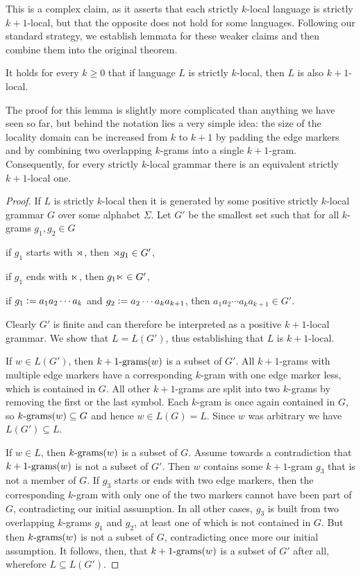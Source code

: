 This is a complex claim, as it asserts that each strictly $k$-local language is strictly $k+1$-local, but that the opposite does not hold for some languages.
Following our standard strategy, we establish lemmata for these weaker claims and then combine them into the original theorem.
%
\begin{lemma}
    It holds for every $k \geq 0$ that if language $L$ is strictly $k$-local, then $L$ is also $k+1$-local.
\end{lemma}
%
The proof for this lemma is slightly more complicated than anything we have seen so far, but behind the notation lies a very simple idea:
the size of the locality domain can be increased from $k$ to $k+1$ by padding the edge markers and by combining two overlapping $k$-grams into a single $k+1$-gram.
Consequently, for every strictly $k$-local grammar there is an equivalent strictly $k+1$-local one.
%
\begin{proof}
    If $L$ is strictly $k$-local then it is generated by some positive strictly $k$-local grammar $G$ over some alphabet $\Sigma$.
    Let $G'$ be the smallest set such that for all $k$-grams $g_1, g_2 \in G$
    \begin{itemize*}
        \item if $g_1$ starts with $\LeftEdge$, then $\LeftEdge g_1 \in G'$,
        \item if $g_1$ ends with $\RightEdge$, then $g_1 \RightEdge \in G'$,
        \item if $g_1 \is a_1 a_2 \cdots a_{k}$ and $g_2 \is a_2 \cdots a_k a_{k+1}$, then $a_1 a_2 \cdots a_k a_{k+1} \in G'$.
    \end{itemize*}
    Clearly $G'$ is finite and can therefore be interpreted as a positive $k+1$-local grammar.
    We show that $L = L(G')$, thus establishing that $L$ is $k+1$-local.
    
    If $w \in L(G')$, then $\Bigrams[k+1](w)$ is a subset of $G'$.
    All $k+1$-grams with multiple edge markers have a corresponding $k$-gram with one edge marker less, which is contained in $G$.
    All other $k+1$-grams are split into two $k$-grams by removing the first or the last symbol.
    Each $k$-gram is once again contained in $G$, so $\Bigrams[k](w) \subseteq G$ and hence $w \in L(G) = L$.
    Since $w$ was arbitrary we have $L(G') \subseteq L$.

    If $w \in L$, then $\Bigrams[k](w)$ is a subset of $G$.
    Assume towards a contradiction that $\Bigrams[k+1](w)$ is not a subset of $G'$.
    Then $w$ contains some $k+1$-gram $g_3$ that is not a member of $G$.
    If $g_3$ starts or ends with two edge markers, then the corresponding $k$-gram with only one of the two markers cannot have been part of $G$, contradicting our initial assumption.
    In all other cases, $g_3$ is built from two overlapping $k$-grams $g_1$ and $g_2$, at least one of which is not contained in $G$.
    But then $\Bigrams[k](w)$ is not a subset of $G$, contradicting once more our initial assumption.
    It follows, then, that $\Bigrams[k+1](w)$ is a subset of $G'$ after all, wherefore $L \subseteq L(G')$.
\end{proof}
